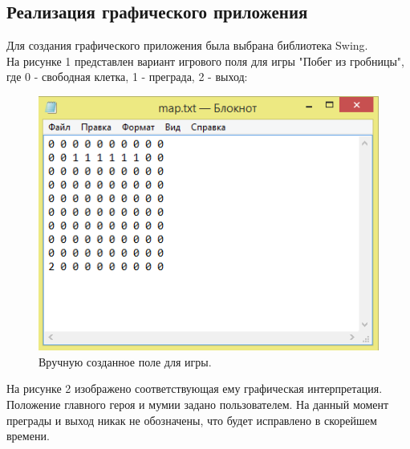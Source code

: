 \subsection{Реализация графического приложения}

Для создания графического приложения была выбрана библиотека Swing.\\


На рисунке 1 представлен вариант игрового поля для игры "Побег из гробницы", где 0 - свободная клетка, 1 - преграда, 2 - выход:

\begin{figure}[H]
	\begin{center}
		\includegraphics[scale=0.7]{image/map.png}
		\caption{Вручную созданное поле для игры.} 
		\label{pic:pic_name} %
	\end{center}
\end{figure}

На рисунке 2 изображено соответствующая ему графическая интерпретация. Положение главного героя и мумии задано пользователем. На данный момент преграды и выход никак не обозначены, что будет исправлено в скорейшем времени. 

